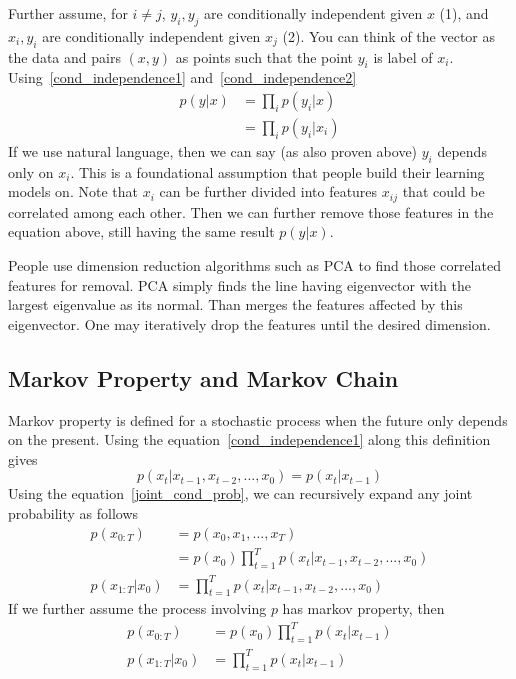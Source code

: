 \documentclass{book}
\numberwithin{equation}{subsection}
\begin{document}
Further assume, for $i \neq j$, $y_i, y_j$ are conditionally independent given $x$ (1), and $x_i, y_i$ are conditionally independent given $x_j$ (2). You can think of the vector as the data and pairs $(x,y)$ as points such that the point $y_i$ is label of $x_i$. Using~\ref{cond_independence1} and~\ref{cond_independence2}
\begin{align}
    p(y|x) &= \prod_i p(y_i|x)\\
           &= \prod_i p(y_i|x_i)
\end{align}
If we use natural language, then we can say (as also proven above) $y_i$ depends only on $x_i$. This is a foundational assumption that people build their learning models on. Note that $x_i$ can be further divided into features $x_{ij}$ that could be correlated among each other. Then we can further remove those features in the equation above, still having the same result $p(y|x)$.

People use dimension reduction algorithms such as PCA to find those correlated features for removal. PCA simply finds the line having eigenvector with the largest eigenvalue as its normal. Than merges the features affected by this eigenvector. One may iteratively drop the features until the desired dimension.
\subsection{Markov Property and Markov Chain}
Markov property is defined for a stochastic process when the future only depends on the present. Using the equation~\ref{cond_independence1} along this definition gives
\begin{equation}
    p(x_t|x_{t-1},x_{t-2},...,x_0) = p(x_t|x_{t-1})
\end{equation}
Using the equation~\ref{joint_cond_prob}, we can recursively expand any joint probability as follows
\begin{align}
    p(x_{0:T}) &= p(x_0,x_1,...,x_T) \\
    &= p(x_0)\prod_{t=1}^T p(x_t|x_{t-1},x_{t-2},...,x_0)\\
    p(x_{1:T}|x_0) &= \prod_{t=1}^T p(x_t|x_{t-1},x_{t-2},...,x_0)
\end{align}
If we further assume the process involving $p$ has markov property, then
\begin{align}
    p(x_{0:T}) &= p(x_0)\prod_{t=1}^T p(x_t|x_{t-1}) \label{markov_chain_joint}\\
    p(x_{1:T}|x_0) &= \prod_{t=1}^T p(x_t|x_{t-1}) \label{markov_chain_cond}
\end{align}
\end{document}
